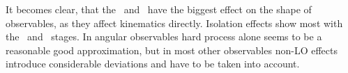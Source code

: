 It becomes clear, that the \sttwo\ and \stthree\ have the biggest
effect on the shape of observables, as they affect kinematics
directly. Isolation effects show most with the \stfour\ and \stfive\
stages. In angular observables hard process alone seems to be a
reasonable good approximation, but in most other observables non-LO
effects introduce considerable deviations and have to be taken into
account.

